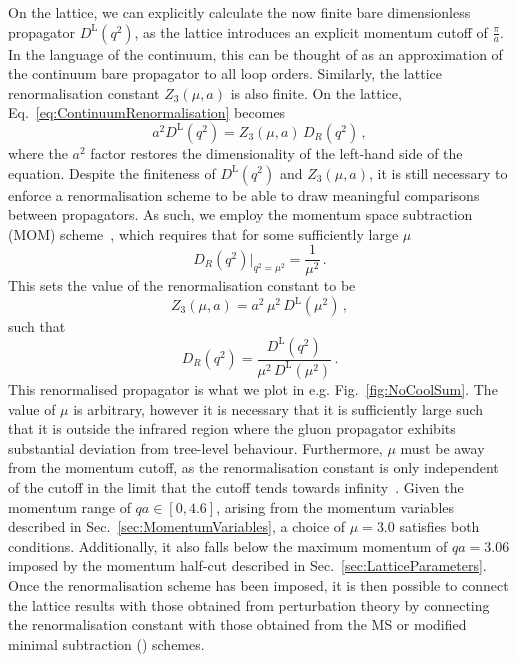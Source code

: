 On the lattice, we can explicitly calculate the now finite bare dimensionless propagator $D^\text{L}(q^2)$, as the lattice introduces an explicit momentum cutoff of $\frac{\pi}{a}$. In the language of the continuum, this can be thought of as an approximation of the continuum bare propagator to all loop orders. Similarly, the lattice renormalisation constant $Z_3(\mu, a)$ is also finite. On the lattice, Eq.~\ref{eq:ContinuumRenormalisation} becomes
%
\begin{equation}
a^2 D^\text{L}(q^2) = Z_3(\mu, a)\, D_R(q^2)\, ,
\label{eq:LatticeRenormalisation}
\end{equation}
%
where the $a^2$ factor restores the dimensionality of the left-hand side of the equation. Despite the finiteness of $D^\text{L}(q^2)$ and $Z_3(\mu, a)$, it is still necessary to enforce a renormalisation scheme to be able to draw meaningful comparisons between propagators. As such, we employ the momentum space subtraction (MOM) scheme~\cite{Bowman:2004jm,Leinweber:1998uu,Bonnet:2001uh}, which requires that for some sufficiently large $\mu$
%
\begin{equation}
D_R(q^2)\big|_{q^2=\mu^2}=\frac{1}{\mu^2}\, .
\end{equation}
%
This sets the value of the renormalisation constant to be
%
\begin{equation}
Z_3(\mu,a) = a^2 \, \mu^2 \, D^\text{L}(\mu^2)\, ,
\end{equation}
such that
%
\begin{equation}
D_R(q^2) = \frac{D^\text{L}(q^2)}{\mu^2 \, D^\text{L}(\mu^2)}\, .
\end{equation}
%
This renormalised propagator is what we plot in e.g. Fig.~\ref{fig:NoCoolSum}. The value of $\mu$ is arbitrary, however it is necessary that it is sufficiently large such that it is outside the infrared region where the gluon propagator exhibits substantial deviation from tree-level behaviour. Furthermore, $\mu$ must be away from the momentum cutoff, as the renormalisation constant is only independent of the cutoff in the limit that the cutoff tends towards infinity~\cite{Bonnet:2001uh,Boucaud:2006pc}. Given the momentum range of $qa\in [0,4.6]$, arising from the momentum variables described in Sec.~\ref{sec:MomentumVariables}, a choice of $\mu =3.0$ satisfies both conditions. Additionally, it also falls below the maximum momentum of $qa = 3.06$ imposed by the momentum half-cut described in Sec.~\ref{sec:LatticeParameters}. Once the renormalisation scheme has been imposed, it is then possible to connect the lattice results with those obtained from perturbation theory by connecting the renormalisation constant with those obtained from the MS or modified minimal subtraction () schemes.\\


